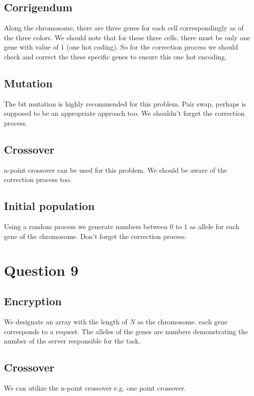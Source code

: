 \documentclass[]{article}
\begin{document}
 	 \subsection*{Corrigendum}
 	 Along the chromosome, there are three genes for each cell correspondingly as of the three colors. We should note that for these three cells, there must be only one gene with value of $1$ (one hot coding). So for the correction process we should check and correct the these specific genes to ensure this one hot encoding.
 	 
 	 \subsection*{Mutation}
 	 The bit mutation is highly recommended for this problem. Pair swap, perhaps is supposed to be an appropriate approach too. We shouldn't forget the correction process.
 	 
 	 \subsection*{Crossover}
 	 n-point crossover can be used for this problem. We should be aware of the correction process too.
	
	\subsection*{Initial population}
	Using a random process we generate numbers between $0$ to $1$ as allele for each gene of the chromosome. Don't forget the correction process.
	
	\section{Question 9}
	\subsection*{Encryption}
	 We designate an array with the length of $N$ as the chromosome. each gene corresponds to a request. The alleles of the genes are numbers demonstrating the number of the server responsible for the task.
	
	\subsection*{Crossover}
	We can utilize the n-point crossover e.g. one point crossover.
	
\end{document}
